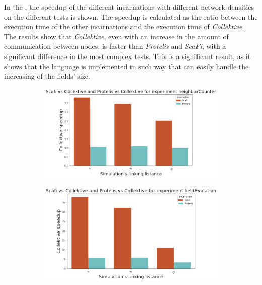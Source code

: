 In the , the speedup of the different incarnations with different network densities on the different tests is shown.
The speedup is calculated as the ratio between the execution time of the other incarnations and the execution time of
\emph{Collektive}.
The results show that \emph{Collektive}, even with an increase in the amount of communication between nodes, is faster than
\emph{Protelis} and \emph{ScaFi}, with a significant difference in the most complex tests.
This is a significant result, as it shows that the language is implemented in such way that can easily handle the increasing
of the fields' size.

\begin{figure}[ht!]
    \centering
    \begin{subfigure}[b]{0.49\textwidth}
        \centering
        \includegraphics[width=\textwidth]{figures/neighbor-speedup}
    \end{subfigure}
    \begin{subfigure}[b]{0.49\textwidth}
        \centering
        \includegraphics[width=\textwidth]{figures/field-speedup}
    \end{subfigure}
    \begin{subfigure}[b]{0.49\textwidth}

\end{subfigure}
\end{figure}

